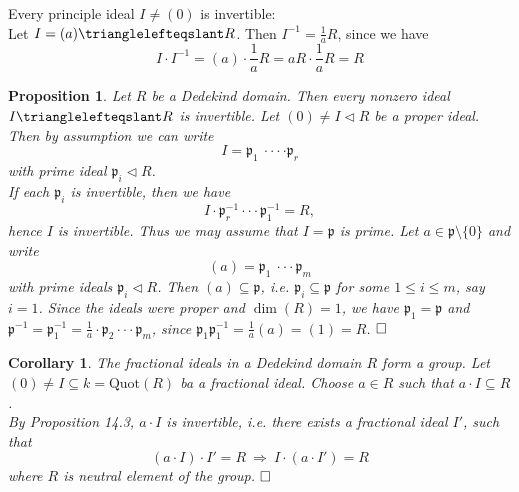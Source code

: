 \documentclass[11pt]{book}
\newtheorem{proposition}[theorem]{Proposition}
\newtheorem{corollary}[theorem]{Corollary}
\theoremstyle{nonumberbreak}
\newenvironment{pr}[1][]{\ifthenelse{\equal{#1}{}}{\proof}{\proof[#1]}\rm}{\endproof}
\newenvironment{ex}[1][]{\ifthenelse{\equal{#1}{}}{\example}{\example[#1]}\rm}{\endexample}
\begin{document}
\begin{spacing}{1.3}
\begin{ex}
Every principle ideal $I \neq ( 0 )$ is invertible:\\
Let $I=( a ) \trianglelefteqslant R$. Then $I^{-1}=\frac{1}{a} R$, since we have
$$I \cdot I^{-1}=( a ) \cdot \frac{1}{a} R=aR \cdot \frac{1}{a}R=R$$
\end{ex}

\begin{proposition} %
Let $R$ be a Dedekind domain. Then every nonzero ideal $I \trianglelefteqslant R$ is invertible.
\begin{pr}
Let $( 0 ) \neq I \triangleleft R$ be a proper ideal. Then by assumption we can write
$$I= \mathfrak{p}_1 \ \cdot \cdot \cdot \cdot \mathfrak{p}_r$$
with prime ideal $\mathfrak{p}_i \triangleleft R$. \\
If each $\mathfrak{p}_i$ is invertible, then we have
$$I \cdot \mathfrak{p}_r^{-1} \cdot \cdot \cdot \mathfrak{p}_1^{-1}=R,$$hence $I$ is invertible. Thus we may assume that $I= \mathfrak{p}$ is prime.
Let $a \in \mathfrak{p} \setminus \{0\}$ and write
$$( a ) = \mathfrak{p}_1 \ \cdot \cdot \cdot \mathfrak{p}_m$$
with prime ideals $\mathfrak{p}_i \triangleleft R$. Then $( a ) \subseteq \mathfrak{p}$, i.e. $\mathfrak{p}_i \subseteq \mathfrak{p}$ for some $1 \leqslant i \leqslant m$, say $i=1$.
Since the ideals were proper and $\dim(R)=1$, we have $\mathfrak{p}_1=\mathfrak{p}$ and $\mathfrak{p}^{-1}=\mathfrak{p}_1^{-1}=\frac{1}{a} \cdot \mathfrak{p}_2 \cdot \cdot \cdot \mathfrak{p}_m$, since $\mathfrak{p}_1 \mathfrak{p}_{1}^{-1}=\frac{1}{a} ( a ) = ( 1 ) = R$. $\hfill \Box$
\end{pr}
\end{proposition}

\begin{corollary} %
The fractional ideals in a Dedekind domain $R$ form a group.
\begin{pr}
Let $( 0 ) \neq I \subseteq k=\textrm{Quot}(R)$ ba a fractional ideal. Choose $a \in R$ such that $a \cdot I \subseteq R$. \\
By Proposition 14.3, $a \cdot I$ is invertible, i.e. there exists a fractional ideal $I'$, such that 
$$(a \cdot I) \cdot I' = R \ \Longrightarrow \ I \cdot (a \cdot I') =R$$
where $R$ is neutral element of the group. $\hfill \Box$
\end{pr}
\end{corollary}


\end{spacing}
\end{document}
